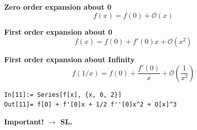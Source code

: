 \documentclass[a4paper, 12pt]{book}
\begin{document}
\begin{tcolorbox}[colback=white, colframe=blue, sharp corners]
    \textbf{Zero order expansion about 0}
    \[ f(x) = f(0) + \mathcal{O}(x) \]
\end{tcolorbox}

\begin{tcolorbox}[colback=white, colframe=blue, sharp corners]
    \textbf{First order expansion about 0}
    \[ f(x) = f(0) + f'(0)x + \mathcal{O}(x^2) \]
\end{tcolorbox}

\begin{tcolorbox}[colback=white, colframe=blue, sharp corners]
    \textbf{First order expansion about Infinity}
    \[ f(1/x) = f(0) + \frac{f'(0)}{x} + \mathcal{O}\left(\frac{1}{x^2}\right) \]
\end{tcolorbox}

\begin{center}
    \begin{minipage}{0.8\linewidth} 
        \begin{verbatim}
In[11]:= Series[f[x], {x, 0, 2}]
Out[11]= f[0] + f'[0]x + 1/2 f''[0]x^2 + O[x]^3
        \end{verbatim}
    \end{minipage}
\end{center}

\vspace{1em}
\noindent
\textbf{Important! $\rightarrow$ SL. }
\end{document}
